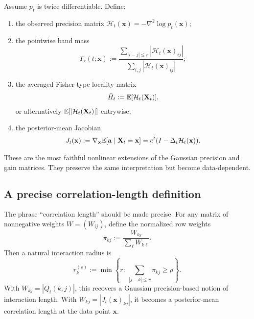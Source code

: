 \documentclass[11pt]{article}
\begin{document}
\begin{definition}
Assume $p_t$ is twice differentiable. Define:
\begin{enumerate}[label=(\roman*),leftmargin=1.2cm]
\item the observed precision matrix $\mathcal H_t(\mathbf x)=-\nabla^2\log p_t(\mathbf x)$;
\item the pointwise band mass
\begin{equation}
 T_r(t;\mathbf x):=\frac{\sum_{|i-j|\leq r}|\mathcal H_t(\mathbf x)_{ij}|}{\sum_{i,j}|\mathcal H_t(\mathbf x)_{ij}|};
\end{equation}
\item the averaged Fisher-type locality matrix
\begin{equation}
 \bar H_t:=\mathbb{E}[\mathcal H_t(\mathbf X_t)],
\end{equation}
or alternatively $\mathbb{E}[|\mathcal H_t(\mathbf X_t)|]$ entrywise;
\item the posterior-mean Jacobian
\begin{equation}
 J_t(\mathbf x):=\nabla_{\mathbf x}\mathbb{E}[\mathbf a\mid \mathbf X_t=\mathbf x]
 =e^t(I-\Delta_t\mathcal H_t(\mathbf x)).
\end{equation}
\end{enumerate}
\end{definition}

These are the most faithful nonlinear extensions of the Gaussian precision and gain matrices. They preserve the same interpretation but become data-dependent.

\subsection{A precise correlation-length definition}

The phrase ``correlation length'' should be made precise. For any matrix of nonnegative weights $W=(W_{ij})$, define the normalized row weights
\begin{equation}
 \pi_{kj}:=\frac{W_{kj}}{\sum_{\ell}W_{k\ell}}.
\end{equation}
Then a natural interaction radius is
\begin{equation}
 r_k^{(\rho)}:=\min\left\{r:\ \sum_{|j-k|\leq r}\pi_{kj}\geq \rho\right\}.
\end{equation}
With $W_{kj}=|Q_t(k,j)|$, this recovers a Gaussian precision-based notion of interaction length. With $W_{kj}=|J_t(\mathbf x)_{kj}|$, it becomes a posterior-mean correlation length at the data point $\mathbf x$.
\end{document}
